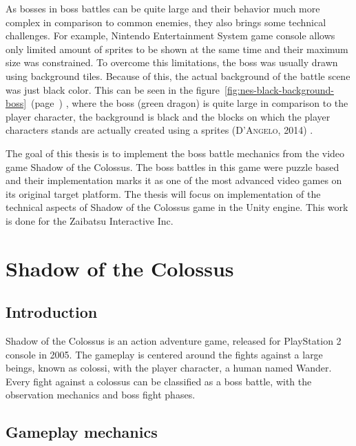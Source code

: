 \documentclass[a4paper]{article}
\newcommand{\reffigure}[1]
{
	figure~\ref{fig:#1}~(page~\pageref{fig:#1})%
}
\newcommand{\rref}[2]
{
	(\textsc{#1, #2})%
}
\begin{document}
As bosses in boss battles can be quite large and their behavior much more complex in comparison to common enemies, they also brings some technical challenges. For example, Nintendo Entertainment System game console allows only limited amount of sprites to be shown at the same time and their maximum size was constrained. To overcome this limitations, the boss was usually drawn using background tiles. Because of this, the actual background of the battle scene was just black color. This can be seen in the \reffigure{nes-black-background-boss}, where the boss (green dragon) is quite large in comparison to the player character, the background is black and the blocks on which the player characters stands are actually created using a sprites \rref{D'Angelo}{2014}.

The goal of this thesis is to implement the boss battle mechanics from the video game Shadow of the Colossus. The boss battles in this game were puzzle based and their implementation marks it as one of the most advanced video games on its original target platform. The thesis will focus on implementation of the technical aspects of Shadow of the Colossus game in the Unity engine. This work is done for the Zaibatsu Interactive Inc. 

\section{Shadow of the Colossus}

\subsection{Introduction}

Shadow of the Colossus is an action adventure game, released for PlayStation 2 console in 2005. The gameplay is centered around the fights against a large beings, known as colossi, with the player character, a human named Wander. Every fight against a colossus can be classified as a boss battle, with the observation mechanics and boss fight phases.

\subsection{Gameplay mechanics}

\end{document}
